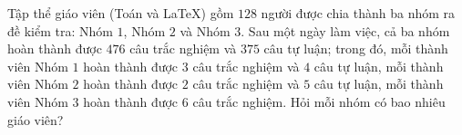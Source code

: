 \begin{bt}%
Tập thể giáo viên (Toán và \LaTeX) gồm $128$ người được chia thành ba nhóm ra đề kiểm tra: Nhóm $1$, Nhóm $2$ và Nhóm $3$. Sau một ngày làm việc, cả ba nhóm hoàn thành được $476$ câu trắc nghiệm và $375$ câu tự luận; trong đó,  mỗi thành viên Nhóm $1$ hoàn thành được $3$ câu trắc nghiệm và $4$ câu tự luận, mỗi thành viên Nhóm $2$ hoàn thành được $2$ câu trắc nghiệm và $5$ câu tự luận, mỗi thành viên Nhóm $3$ hoàn thành được $6$ câu trắc nghiệm. Hỏi mỗi nhóm có bao nhiêu giáo viên?           
\end{bt}

